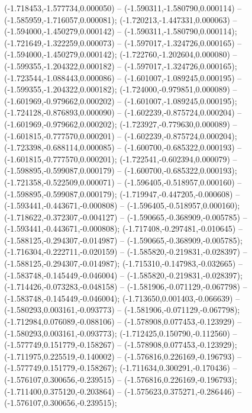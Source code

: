  (-1.718453,-1.577734,0.000050) -- (-1.590311,-1.580790,0.000114) -- (-1.585959,-1.716057,0.000081);
 (-1.720213,-1.447331,0.000063) -- (-1.594000,-1.450279,0.000142) -- (-1.590311,-1.580790,0.000114);
 (-1.721649,-1.322259,0.000073) -- (-1.597017,-1.324726,0.000165) -- (-1.594000,-1.450279,0.000142);
 (-1.722760,-1.202604,0.000080) -- (-1.599355,-1.204322,0.000182) -- (-1.597017,-1.324726,0.000165);
 (-1.723544,-1.088443,0.000086) -- (-1.601007,-1.089245,0.000195) -- (-1.599355,-1.204322,0.000182);
 (-1.724000,-0.979851,0.000089) -- (-1.601969,-0.979662,0.000202) -- (-1.601007,-1.089245,0.000195);
 (-1.724128,-0.876893,0.000090) -- (-1.602239,-0.875724,0.000204) -- (-1.601969,-0.979662,0.000202);
 (-1.723927,-0.779630,0.000089) -- (-1.601815,-0.777570,0.000201) -- (-1.602239,-0.875724,0.000204);
 (-1.723398,-0.688114,0.000085) -- (-1.600700,-0.685322,0.000193) -- (-1.601815,-0.777570,0.000201);
 (-1.722541,-0.602394,0.000079) -- (-1.598895,-0.599087,0.000179) -- (-1.600700,-0.685322,0.000193);
 (-1.721358,-0.522509,0.000071) -- (-1.596405,-0.518957,0.000160) -- (-1.598895,-0.599087,0.000179);
 (-1.719947,-0.447205,-0.000608) -- (-1.593441,-0.443671,-0.000808) -- (-1.596405,-0.518957,0.000160);
 (-1.718622,-0.372307,-0.004127) -- (-1.590665,-0.368909,-0.005785) -- (-1.593441,-0.443671,-0.000808);
 (-1.717408,-0.297481,-0.010645) -- (-1.588125,-0.294307,-0.014987) -- (-1.590665,-0.368909,-0.005785);
 (-1.716304,-0.222711,-0.020159) -- (-1.585820,-0.219831,-0.028397) -- (-1.588125,-0.294307,-0.014987);
 (-1.715310,-0.147983,-0.032665) -- (-1.583748,-0.145449,-0.046004) -- (-1.585820,-0.219831,-0.028397);
 (-1.714426,-0.073283,-0.048158) -- (-1.581906,-0.071129,-0.067798) -- (-1.583748,-0.145449,-0.046004);
 (-1.713650,0.001403,-0.066639) -- (-1.580293,0.003161,-0.093773) -- (-1.581906,-0.071129,-0.067798);
 (-1.712984,0.076089,-0.088106) -- (-1.578908,0.077453,-0.123929) -- (-1.580293,0.003161,-0.093773);
 (-1.712425,0.150790,-0.112560) -- (-1.577749,0.151779,-0.158267) -- (-1.578908,0.077453,-0.123929);
 (-1.711975,0.225519,-0.140002) -- (-1.576816,0.226169,-0.196793) -- (-1.577749,0.151779,-0.158267);
 (-1.711634,0.300291,-0.170436) -- (-1.576107,0.300656,-0.239515) -- (-1.576816,0.226169,-0.196793);
 (-1.711400,0.375120,-0.203864) -- (-1.575623,0.375271,-0.286446) -- (-1.576107,0.300656,-0.239515);
